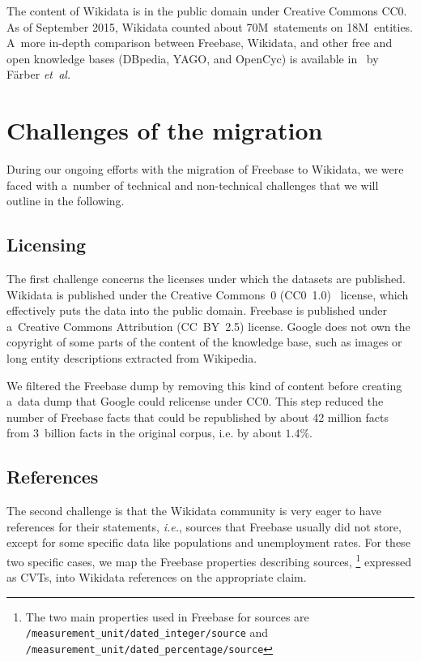 \documentclass{acm_proc_article-sp}
\begin{document}
The content of Wikidata is in the public domain under Creative Commons CC0.
As of September 2015, Wikidata counted about 70M~statements on 18M~entities.
A~more in-depth comparison between Freebase, Wikidata, and other free and open knowledge bases
(DBpedia, YAGO, and OpenCyc) is available in~\cite{farbercomparative} by Färber \emph{et~al.}

\section{Challenges of the migration}\label{sec:challenges-of-the-migration}

During our ongoing efforts with the migration of Freebase to Wikidata,
we were faced with a~number of technical and non-technical challenges
that we will outline in the following.

\subsection{Licensing}
\label{sec:licensing}

The first challenge concerns the licenses under which the datasets are published.
Wikidata is published under the Creative Commons~0 (CC0~1.0)~\cite{cc0} license,
which effectively puts the data into the public domain.
Freebase is published under a~Creative Commons Attribution (CC~BY~2.5) license.
Google does not own the copyright of some parts of the content of the knowledge base,
such as images or long entity descriptions extracted from Wikipedia.

We filtered the Freebase dump by removing this kind of content
before creating a~data dump that Google could relicense under CC0.
This step reduced the number of Freebase facts that could be republished by about 42 million facts
from 3~billion facts in the original corpus, i.e. by about $1.4\%$.

\subsection{References}

The second challenge is that the Wikidata community is very eager to have references
for their statements, \emph{i.e.}, sources that Freebase usually did not store,
except for some specific data like populations and unemployment rates.
For these two specific cases, we map the Freebase properties describing sources,%
\footnote{The two main properties used in Freebase for sources are
\texttt{/measurement\_unit/dated\_integer/source} and
\texttt{/measurement\_unit/dated\_percentage/source}}
expressed as CVTs, into Wikidata references on the appropriate claim.
\end{document}
